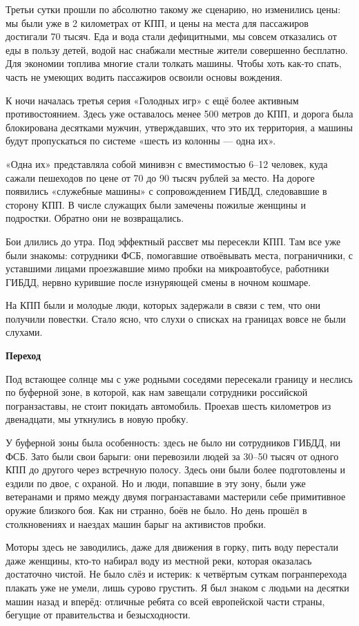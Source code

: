Третьи сутки прошли по абсолютно такому же сценарию, но изменились цены: мы были уже в 2 километрах от КПП, и цены на места для пассажиров достигали 70 тысяч. Еда и вода стали дефицитными, мы совсем отказались от еды в пользу детей, водой нас снабжали местные жители совершенно бесплатно. Для экономии топлива многие стали толкать машины. Чтобы хоть как-то спать, часть не умеющих водить пассажиров освоили основы вождения.

К ночи началась третья серия «Голодных игр» с ещё более активным противостоянием. Здесь уже оставалось менее 500 метров до КПП, и дорога была блокирована десятками мужчин, утверждавших, что это их территория, а машины будут пропускаться по системе «шесть из колонны — одна их».


«Одна их» представляла собой минивэн с вместимостью 6–12 человек, куда сажали пешеходов по цене от 70 до 90 тысяч рублей за место. На дороге появились «служебные машины» с сопровождением ГИБДД, следовавшие в сторону КПП. В числе служащих были замечены пожилые женщины и подростки. Обратно они не возвращались.

Бои длились до утра. Под эффектный рассвет мы пересекли КПП. Там все уже были знакомы: сотрудники ФСБ, помогавшие отвоёвывать места, пограничники, с уставшими лицами проезжавшие мимо пробки на микроавтобусе, работники ГИБДД, нервно курившие после изнуряющей смены в ночном кошмаре.

На КПП были и молодые люди, которых задержали в связи с тем, что они получили повестки. Стало ясно, что слухи о списках на границах вовсе не были слухами.


\textbf{Переход}

Под встающее солнце мы с уже родными соседями пересекали границу и неслись по буферной зоне, в которой, как нам завещали сотрудники российской погранзаставы, не стоит покидать автомобиль. Проехав шесть километров из двенадцати, мы уткнулись в новую пробку.

У буферной зоны была особенность: здесь не было ни сотрудников ГИБДД, ни ФСБ. Зато были свои барыги: они перевозили людей за 30–50 тысяч от одного КПП до другого через встречную полосу. Здесь они были более подготовлены и ездили по двое, с охраной. Но и люди, попавшие в эту зону, были уже ветеранами и прямо между двумя погранзаставами мастерили себе примитивное оружие близкого боя. Как ни странно, боёв не было. Но день прошёл в столкновениях и наездах машин барыг на активистов пробки.

Моторы здесь не заводились, даже для движения в горку, пить воду перестали даже женщины, кто-то набирал воду из местной реки, которая оказалась достаточно чистой. Не было слёз и истерик: к четвёртым суткам погранперехода плакать уже не умели, лишь сурово грустить. Я был знаком с людьми на десятки машин назад и вперёд: отличные ребята со всей европейской части страны, бегущие от правительства и безысходности.

